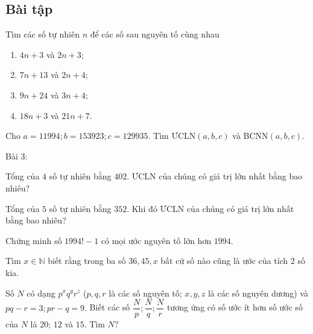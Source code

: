 \subsection{Bài tập}
\setcounter{bt}{0}
\begin{bt}%
	Tìm các số tự nhiên $ n $ để các số sau nguyên tố cùng nhau
	\begin{multicols}{4}
		\begin{enumerate}
			\item $ 4n+3 $ và $ 2n+3 ;$
			\item $ 7n+13 $ và $ 2n+4 ;$
			\item $ 9n+24 $ và $ 3n+4 ;$
			\item $ 18n+3 $ và $ 21n+7. $
		\end{enumerate}
	\end{multicols}
\end{bt}
\begin{bt}%
	Cho $ a=11994; b=153923; c=129935. $ Tìm ƯCLN$ (a,b,c) $ và BCNN$ (a,b,c).$
\end{bt}
Bài 3:	
\begin{bt}%
	Tổng của $ 4 $ số tự nhiên bằng $ 402. $ ƯCLN của chúng có giá trị lớn nhất bằng bao nhiêu?
\end{bt}
\begin{bt}%
	Tổng của $ 5 $ số tự nhiên bằng $ 352 $. Khi đó ƯCLN của chúng có giá trị lớn nhất bằng bao nhiêu?
\end{bt}
\begin{bt}%
	Chứng minh số $ 1994!-1 $ có mọi ước nguyên tố lớn hơn $ 1994 .$
\end{bt}
\begin{bt}%
	Tìm $ x\in \mathbb{N} $ biết rằng trong ba số $ 36, 45, x $ bất cứ số nào cũng là ước của tích $ 2 $ số kia.
\end{bt}
\begin{bt}%
	Số $ N $ có dạng $ p^x q^y r^z $ ($ p, q, r $ là các số nguyên tố; $ x, y, z $ là các số nguyên dương) và $ pq-r=3; pr-q=9. $ Biết các số $ \dfrac{N}{p}; \dfrac{N}{q}; \dfrac{N}{r} $ tương ứng có số ước ít hơn số ước số của $ N $ là $ 20 $; $ 12 $ và $ 15 $. Tìm $ N? $
\end{bt}





